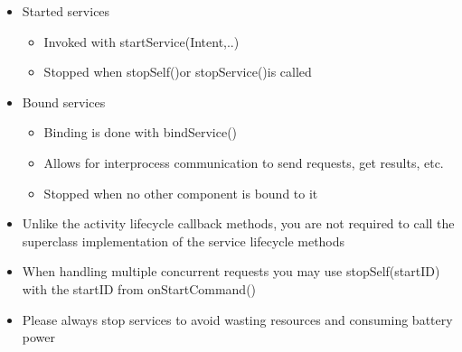 \begin{breakbox}

\begin{itemize}
\tightlist
\item
  Started services

  \begin{itemize}
  \tightlist
  \item
    Invoked with startService(Intent,..)
  \item
    Stopped when stopSelf()or stopService()is called
  \end{itemize}
\item
  Bound services

  \begin{itemize}
  \tightlist
  \item
    Binding is done with bindService()
  \item
    Allows for interprocess communication to send requests, get results,
    etc.
  \item
    Stopped when no other component is bound to it
  \end{itemize}
\end{itemize}

\end{breakbox}

\begin{breakbox}

\begin{itemize}
\tightlist
\item
  Unlike the activity lifecycle callback methods, you are not required
  to call the superclass implementation of the service lifecycle methods
\item
  When handling multiple concurrent requests you may use
  stopSelf(startID) with the startID from onStartCommand()
\item
  Please always stop services to avoid wasting resources and consuming
  battery power
\end{itemize}

\end{breakbox}

